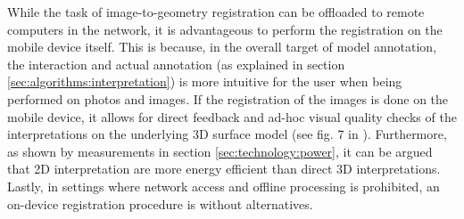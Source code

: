 \documentclass[review]{elsarticle}
\begin{document}

While the task of image-to-geometry registration can be offloaded to remote computers in the network, it is advantageous to perform the registration on the mobile device itself. This is because, in the overall target of model annotation, the interaction and actual annotation (as explained in section \ref{sec:algorithms:interpretation}) is more intuitive for the user when being performed on photos and images. If the registration of the images is done on the mobile device, it allows for direct feedback and ad-hoc visual quality checks of the interpretations on the underlying 3D surface model (see fig. 7 in \cite{Kehl2017_VGC}). Furthermore, as shown by measurements in section \ref{sec:technology:power}, it can be argued that 2D interpretation are more energy efficient than direct 3D interpretations. Lastly, in settings where network access and offline processing is prohibited, an on-device registration procedure is without alternatives.
\end{document}
